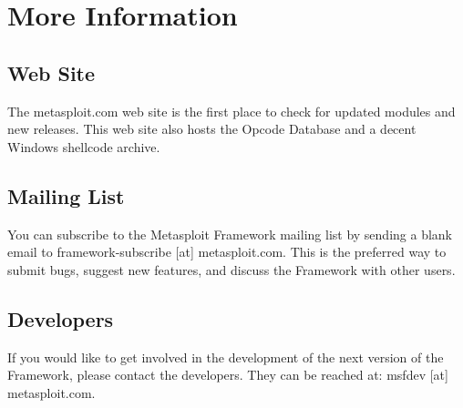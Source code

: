 \documentclass{report}
\begin{document}
\pagebreak
\chapter{More Information}


\section{Web Site}
\par
The metasploit.com web site is the first place to check for updated modules and
new releases. This web site also hosts the Opcode Database and a decent Windows
shellcode archive.  

\section{Mailing List}
\par
You can subscribe to the Metasploit Framework mailing list by sending a blank
email to framework-subscribe [at] metasploit.com. This is the preferred way to
submit bugs, suggest new features, and discuss the Framework with other users. 

\section{Developers}
\par
If you would like to get involved in the development of the next version of the Framework, please contact the developers. They can be reached at: 
msfdev [at] metasploit.com.
\end{document}
